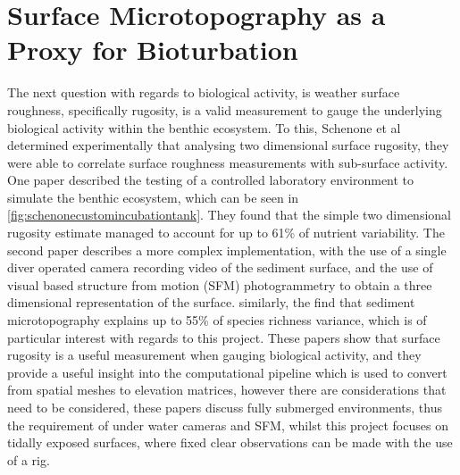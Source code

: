  
 \section{Surface Microtopography as a Proxy for Bioturbation}
 
  The next question with regards to biological activity, is weather surface roughness, specifically rugosity, is a valid measurement to gauge the underlying biological activity within the benthic ecosystem. To this, Schenone et al \cite{schenoneSedimentMicrotopographyPredicts2024,schenoneSeafloorSedimentMicrotopography2025} determined experimentally that analysing two dimensional surface rugosity, they were able to correlate surface roughness measurements with sub-surface activity. One paper \cite{schenoneSedimentMicrotopographyPredicts2024} described the testing of a controlled laboratory environment to simulate the benthic ecosystem, which can be seen in \autoref{fig:schenonecustomincubationtank}. They found that the simple two dimensional rugosity estimate managed to account for up to 61\% of nutrient variability. The second paper\cite{schenoneSeafloorSedimentMicrotopography2025} describes a more complex implementation, with the use of a single diver operated camera recording video of the sediment surface, and the use of visual based structure from motion (SFM) photogrammetry to obtain a three dimensional representation of the surface. similarly, the find that sediment microtopography explains up to 55\% of species richness variance, which is of particular interest with regards to this project. These papers show that surface rugosity is a useful measurement when gauging biological activity, and they provide a useful insight into the computational pipeline which is used to convert from spatial meshes to elevation matrices, however there are considerations that need to be considered, these papers discuss fully submerged environments, thus the requirement of under water cameras and SFM, whilst this project focuses on tidally exposed surfaces, where fixed clear observations can be made with the use of a rig.
 
